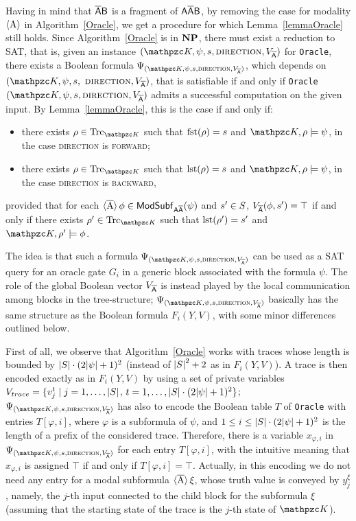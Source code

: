 Having in mind that $\mathsf{\overline{A}B}$ is a fragment of $\mathsf{A\overline{A}B}$, by removing the case for modality $\operatorname{\langle A\rangle}$ in Algorithm~\ref{Oracle}, we get a procedure for which Lemma~\ref{lemmaOracle} still holds. 
Since Algorithm~\ref{Oracle} is in $\textbf{NP}$, there must exist a reduction to SAT, that is, given an instance $(\Ku,\psi,s,\textsc{direction},V_{\Abar})$ for \texttt{Oracle}, there exists a Boolean formula $\Psi_{(\Ku,\psi,s,\textsc{direction},V_{\Abar})}$, which depends on $(\Ku,\psi,s,$ $\textsc{direction}, V_{\mathsf{\overline{A}}})$, that is satisfiable if and only if \texttt{Oracle}$(\Ku,\psi,s,\allowbreak \textsc{direction}, V_{\Abar})$ admits a successful computation on the given input. 
By Lemma~\ref{lemmaOracle}, this is the case if and only if:  
\begin{itemize}
	\item there exists $\rho\in\Trk_{\Ku}$ such that $\operatorname{fst}(\rho)=s$ and $\Ku,\rho\models \psi$, in the case \textsc{direction} is \textsc{forward};
	\item there exists $\rho\in\Trk_{\Ku}$ such that $\operatorname{lst}(\rho)=s$ and $\Ku,\rho\models \psi$, in the case \textsc{direction} is \textsc{backward},
\end{itemize}
provided that 
for each $\operatorname{\langle \overline{A}\rangle} \phi\in\mathsf{ModSubf}_{\mathsf{A\overline{A}}}(\psi)$ and $s'\in S$, $V_{\mathsf{\overline{A}}}(\phi,s')=\top$ if and only if there exists $\rho'\in\Trk_{\Ku}$ such that $\operatorname{lst}(\rho')=s'$ and $\Ku,\rho'\models \phi$.

The idea is that such a formula $\Psi_{(\Ku,\psi,s,\textsc{direction},V_{\Abar})}$ can be used as a SAT query for an oracle gate $G_i$ in a generic block associated with the formula $\psi$. The role of the global Boolean vector $V_{\mathsf{\overline{A}}}$ is instead played by the local communication among blocks in the tree-structure; 
$\Psi_{(\Ku,\psi,s,\textsc{direction},V_{\Abar})}$ %
basically has the same structure as the Boolean formula $F_i(Y,V)$, with some minor differences outlined below.

First of all, we observe that Algorithm~\ref{Oracle} works with traces whose length is bounded by $|S|\cdot (2|\psi|+1)^2$ (instead of ${| S |}^2+ 2$ as in $F_i(Y,V)$). A trace is then encoded exactly as in $F_i(Y,V)$ by using a set of private variables
$V_{trace}=\{v_j^t \mid j=1,\ldots ,|S|$, $t=1,\ldots , |S|\cdot (2|\psi|+1)^2 \}$;
%
$\Psi_{(\Ku,\psi,s,\textsc{direction},V_{\Abar})}$ has also to encode the Boolean table $T$ of \texttt{Oracle} with entries $T[\varphi,i]$, where $\varphi$ is a subformula of $\psi$, and $1 \leq i \leq |S|\cdot (2|\psi|+1)^2$ is the length of a prefix of the considered trace. Therefore,
there is a variable $x_{\varphi,i}$ in  $\Psi_{(\Ku,\psi,s,\textsc{direction},V_{\Abar})}$ for each entry $T[\varphi,i]$, with the intuitive meaning that $x_{\varphi,i}$ is assigned $\top$ if and only if $T[\varphi,i]=\top$. Actually, in this encoding we do not need any entry for a modal subformula $\operatorname{\langle \overline{A}\rangle} \xi$, whose truth value is conveyed by $y_j^\xi$, namely, the $j$-th input connected to the child block for the subformula $\xi$ (assuming that the starting state of the trace is the $j$-th state of $\Ku$).

